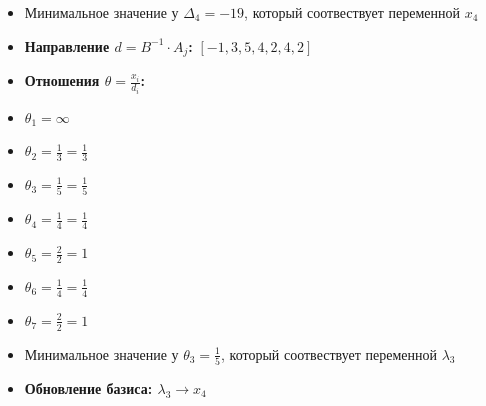 \begin{itemize}
\begin{itemize}
$[3, -1, -15, -19, -3, 1, -1, -1, -1, -1, 1, 1, -1, 0, 0, 0, 0, 0, 0, 0]$
\item Минимальное значение у  $\Delta_{4} = -19$, который соотвествует переменной $x_4$
\item \textbf{Направление $d = B^{-1} \cdot A_j$:}
$[-1, 3, 5, 4, 2, 4, 2]$
\item \textbf{Отношения $\theta = \frac{x_i}{d_i}$:}
\item $\theta_{1} = \infty$
\item $\theta_{2} = \frac{1}{3} = \frac{1}{3}$
\item $\theta_{3} = \frac{1}{5} = \frac{1}{5}$
\item $\theta_{4} = \frac{1}{4} = \frac{1}{4}$
\item $\theta_{5} = \frac{2}{2} = 1$
\item $\theta_{6} = \frac{1}{4} = \frac{1}{4}$
\item $\theta_{7} = \frac{2}{2} = 1$
\item Минимальное значение у  $\theta_{3} = \frac{1}{5}$, который соотвествует переменной $\lambda_3$
\item \textbf{Обновление базиса: $\lambda_3 \rightarrow x_4$}
\end{itemize}
\newpage

\end{itemize}

